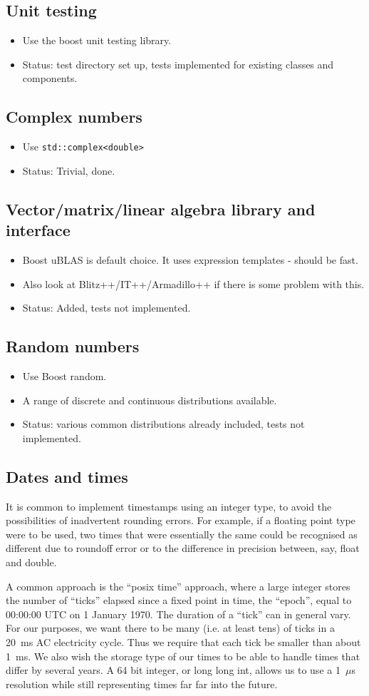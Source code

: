\documentclass[12pt]{article}
\newcommand{\itm}[1]{\begin{itemize}#1\end{itemize}}
\begin{document}
\subsection{Unit testing}
\itm{
	\item Use the boost unit testing library.
	\item Status: test directory set up, tests implemented for existing classes and components.
}

\subsection{Complex numbers}
\itm{
	\item Use \texttt{std::complex<double>}
	\item Status: Trivial, done.
}

\subsection{Vector/matrix/linear algebra library and interface}
\itm{
	\item Boost uBLAS is default choice. It uses expression templates - should be fast.
	\item Also look at Blitz++/IT++/Armadillo++ if there is some problem with this.
	\item Status: Added, tests not implemented.
}

\subsection{Random numbers}
\itm{
	\item Use Boost random.
	\item A range of discrete and continuous distributions available.
	\item Status: various common distributions already included, tests not implemented.
}

\subsection{Dates and times}
It is common to implement timestamps using an integer type, to avoid the possibilities of inadvertent rounding errors. For example, if a floating point type were to be used, two times that were essentially the same could be recognised as different due to roundoff error or to the difference in precision between, say, float and double.

A common approach is the ``posix time'' approach, where a large integer stores the number of ``ticks'' elapsed since a fixed point in time, the ``epoch'', equal to  00:00:00 UTC on 1 January 1970. The duration of a ``tick'' can in general vary. For our purposes, we want there to be many (i.e. at least tens) of ticks in a 20~ms AC electricity cycle. Thus we require that each tick be smaller than about 1~ms. We also wish the storage type of our times to be able to handle times that differ by several years. A 64 bit integer, or long long int, allows us to use a 1~$\mu$s resolution while still representing times far far into the future.
\end{document}
